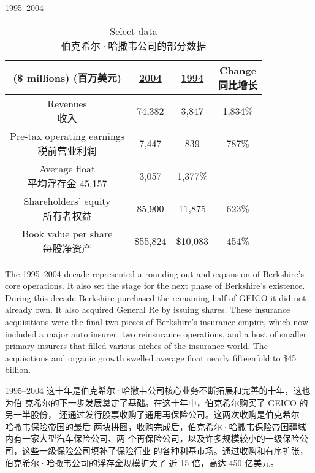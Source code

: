 \begin{section}{1995--2004}

\begin{table}[!htbp]
  \centering
  \begin{center}
    \begin{tabular}{cccc}
      \toprule
      \makecell[c]{(\$ millions) \\ (百万美元)} & \underline{2004} & \underline{1994} & \makecell[c]{\underline{Change} \\ \underline{同比增长}} \\
      \midrule
      \makecell[c]{Revenues \\ 收入} & 74,382 & 3,847 & 1,834\% \\
      \makecell[c]{Pre-tax operating earnings \\ 税前营业利润} & 7,447 & 839 & 787\% \\
      \makecell[c]{Average float \\ 平均浮存金} 45,157 & 3,057 & 1,377\% \\
      \makecell[c]{Shareholders' equity \\ 所有者权益} & 85,900 & 11,875 & 623\% \\
      \makecell[c]{Book value per share \\ 每股净资产} & \$55,824 & \$10,083 & 454\% \\
      \bottomrule
    \end{tabular}
    \caption{Select data \\ 伯克希尔·哈撒韦公司的部分数据}
  \end{center}
\end{table}

\begin{verseparallel}
  {
    The 1995--2004 decade represented a rounding out and expansion of
    Berkshire's core operations. It also set the stage for the next phase of
    Berkshire's existence. During this decade Berkshire purchased the
    remaining half of GEICO it did not already own. It also acquired General
    Re by issuing shares. These insurance acquisitions were the final two pieces
    of Berkshire's insurance empire, which now included a major auto insurer,
    two reinsurance operations, and a host of smaller primary insurers that
    filled various niches of the insurance world. The acquisitions and organic
    growth swelled average float nearly fifteenfold to \$45 billion. \\
  }
  {

    1995--2004 这十年是伯克希尔·哈撒韦公司核心业务不断拓展和完善的十年，这也为伯
    克希尔的下一步发展奠定了基础。在这十年中，伯克希尔购买了 GEICO 的另一半股份，
    还通过发行股票收购了通用再保险公司。这两次收购是伯克希尔·哈撒韦保险帝国的最后
    两块拼图，收购完成后，伯克希尔·哈撒韦保险帝国疆域内有一家大型汽车保险公司、两
    个再保险公司，以及许多规模较小的一级保险公司，这些一级保险公司填补了保险行业
    的各种利基市场。通过收购和有序扩张，伯克希尔·哈撒韦公司的浮存金规模扩大了
    近 15 倍，高达 450 亿美元。

}
\end{verseparallel}
\end{section}
